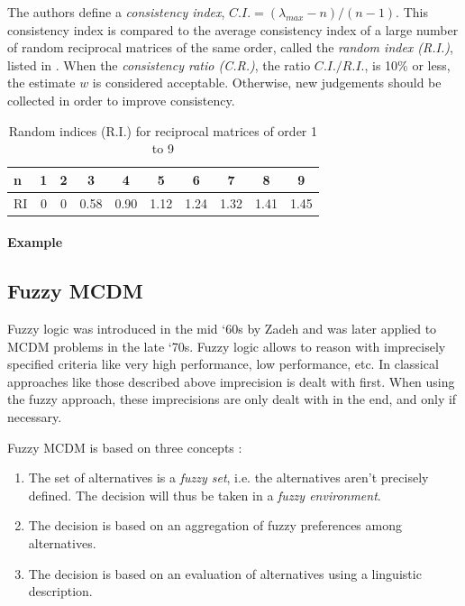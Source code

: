 The authors define a \emph{consistency index}, $C.I. = (\lambda_{max} - n) / (n - 1)$. This consistency index is compared to the average consistency index of a large number of random reciprocal matrices of the same order, called the \emph{random index (R.I.)}, listed in . When the \emph{consistency ratio (C.R.)}, the ratio $C.I. / R.I.$, is 10\% or less, the estimate $w$ is considered acceptable. Otherwise, new judgements should be collected in order to improve consistency.

\begin{table}[h!]
\begin{center}
    \begin{tabular}{l*{9}{|c}}
        n & 1 & 2 & 3 & 4 & 5 & 6 & 7 & 8 & 9\\
        \hline
        RI & 0 & 0 & 0.58 & 0.90 & 1.12 & 1.24 & 1.32 & 1.41 & 1.45
    \end{tabular}
    \caption{Random indices (R.I.) for reciprocal matrices of order 1 to 9}
    \label{tab:ri}
\end{center}
\end{table}

\paragraph{Example}

\subsection{Fuzzy MCDM}
\label{sec:fuzzy}


Fuzzy logic was introduced in the mid `60s by Zadeh and was later applied to MCDM problems in the late `70s. Fuzzy logic allows to reason with imprecisely specified criteria like very high performance, low performance, etc. In classical approaches like those described above imprecision is dealt with first. When using the fuzzy approach, these imprecisions are only dealt with in the end, and only if necessary.

Fuzzy MCDM is based on three concepts \cite{FuzzySetApproach}:

\begin{enumerate}
    \item The set of alternatives is a \emph{fuzzy set}, i.e. the alternatives aren't precisely defined. The decision will thus be taken in a \emph{fuzzy environment}. 
    \item The decision is based on an aggregation of fuzzy preferences among alternatives.
    \item The decision is based on an evaluation of alternatives using a linguistic description.
\end{enumerate}

